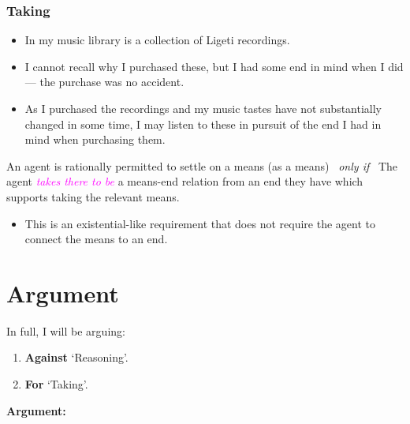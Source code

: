 \documentclass[10pt]{article}
\newenvironment{beamerblock}[1]{%
  \tcolorbox[standard,%
  no shadow,
  noparskip,
  colback=white,
  colframe=black,
  colbacktitle=white,
  coltitle=black,
  colupper=black,
  size=small,
  boxrule=.125mm,
  fonttitle=\bfseries,
  sharp corners=all,
  title=#1]}%
{\endtcolorbox}
\newcommand{\hozlinedash}[0]{%
  \noindent\hdashrule[0.5ex][c]{\textwidth}{.1pt}{2.5pt}
}
\begin{document}
\hozlinedash

\subsubsection{Taking}
\label{sec:taking}

\begin{itemize}
\item In my music library is a collection of Ligeti recordings.
\item I cannot recall why I purchased these, but I had some end in mind when I did --- the purchase was no accident.
\item As I purchased the recordings and my music tastes have not substantially changed in some time, I may listen to these in pursuit of the end I had in mind when purchasing them.
\end{itemize}

\begin{beamerblock}{Taking}
  An agent is rationally permitted to settle on a means (as a means)
  \newline
  \mbox{ }\hfill\emph{only if}\hfill\mbox{ }
  \newline
  The agent \textcolor{fuchsia}{\emph{takes there to be}} a means-end relation from an end they have which supports taking the relevant means.
\end{beamerblock}

\begin{itemize}
\item This is an existential-like requirement that does not require the agent to connect the means to an end.
\end{itemize}

\hozlinedash

\newpage

\section{Argument}
\label{sec:argument}

In full, I will be arguing:
\begin{enumerate}[label=\roman*., ref=(\roman*)]
\item\label{position:Against} \textbf{Against} `Reasoning'.
\item\label{position:For} \textbf{For} `Taking'.
\end{enumerate}

\noindent\textbf{Argument:}
\end{document}
